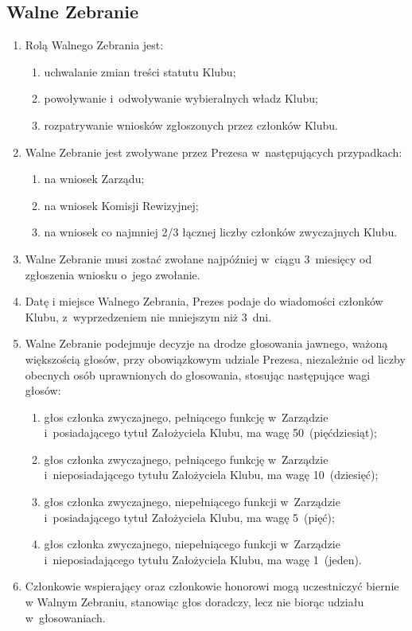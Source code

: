 \subsection{Walne Zebranie}
\begin{enumerate}
    \item Rolą Walnego Zebrania jest:
    \begin{enumerate}
        \item uchwalanie zmian treści statutu Klubu;
        \item powoływanie i~odwoływanie wybieralnych władz Klubu;
        \item rozpatrywanie wniosków zgłoszonych przez członków Klubu.
    \end{enumerate}
    \item Walne Zebranie jest zwoływane przez Prezesa w~następujących przypadkach:
    \begin{enumerate}
        \item na wniosek Zarządu;
        \item na wniosek Komisji Rewizyjnej;
        \item na wniosek co najmniej 2/3 łącznej liczby członków zwyczajnych Klubu.
    \end{enumerate}
    \item Walne Zebranie musi zostać zwołane najpóźniej w~ciągu 3~miesięcy od zgłoszenia wniosku o~jego zwołanie.
    \item Datę i miejsce Walnego Zebrania, Prezes podaje do wiadomości członków Klubu, z~wyprzedzeniem nie mniejszym niż 3~dni.
    \item Walne Zebranie podejmuje decyzje na drodze głosowania jawnego, ważoną większością głosów, przy obowiązkowym udziale Prezesa, niezależnie od liczby obecnych osób uprawnionych do głosowania, stosując następujące wagi głosów:
    \begin{enumerate}
        \item głos członka zwyczajnego, pełniącego funkcję w~Zarządzie i~posiadającego tytuł Założyciela Klubu, ma wagę 50~(pięćdziesiąt);
        \item głos członka zwyczajnego, pełniącego funkcję w~Zarządzie i~nieposiadającego tytułu Założyciela Klubu, ma wagę 10~(dziesięć);
        \item głos członka zwyczajnego, niepełniącego funkcji w~Zarządzie i~posiadającego tytuł Założyciela Klubu, ma wagę 5~(pięć);
        \item głos członka zwyczajnego, niepełniącego funkcji w~Zarządzie i~nieposiadającego tytułu Założyciela Klubu, ma wagę 1~(jeden).
    \end{enumerate}
    \item Członkowie wspierający oraz członkowie honorowi mogą uczestniczyć biernie w Walnym Zebraniu, stanowiąc głos doradczy, lecz nie biorąc udziału w~głosowaniach.
\end{enumerate}
